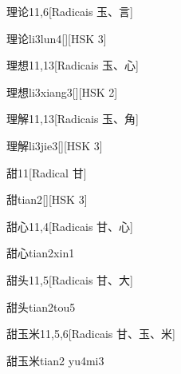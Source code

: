 \begin{entry}{理论}{11,6}[Radicais ⽟、⾔]
  \begin{phonetics}{理论}{li3lun4}[][HSK 3]
  \end{phonetics}
\end{entry}

\begin{entry}{理想}{11,13}[Radicais ⽟、⼼]
  \begin{phonetics}{理想}{li3xiang3}[][HSK 2]
  \end{phonetics}
\end{entry}

\begin{entry}{理解}{11,13}[Radicais ⽟、⾓]
  \begin{phonetics}{理解}{li3jie3}[][HSK 3]
  \end{phonetics}
\end{entry}

\begin{entry}{甜}{11}[Radical ⽢]
  \begin{phonetics}{甜}{tian2}[][HSK 3]
  \end{phonetics}
\end{entry}

\begin{entry}{甜心}{11,4}[Radicais ⽢、⼼]
  \begin{phonetics}{甜心}{tian2xin1}
  \end{phonetics}
\end{entry}

\begin{entry}{甜头}{11,5}[Radicais ⽢、⼤]
  \begin{phonetics}{甜头}{tian2tou5}
  \end{phonetics}
\end{entry}

\begin{entry}{甜玉米}{11,5,6}[Radicais ⽢、⽟、⽶]
  \begin{phonetics}{甜玉米}{tian2 yu4mi3}
  \end{phonetics}
\end{entry}


